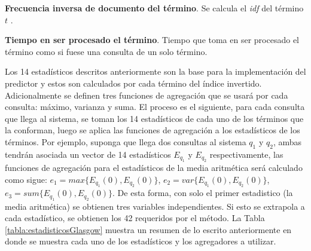 \begin{list}{}{}
	\item \textbf{Frecuencia inversa de documento del término}. Se calcula el \textit{idf} del término $t$ \citep{Baeza-Yates:2011}.
	
	\item \textbf{Tiempo en ser procesado el término}. Tiempo que toma en ser procesado el término como si fuese una consulta de un solo término.

\end{list}

Los 14 estadísticos descritos anteriormente son la base para la implementación del predictor y estos son calculados por cada término del índice invertido. Adicionalmente se definen tres funciones de agregación que se usará por cada consulta: máximo, varianza y suma. El proceso es el siguiente, para cada consulta que llega al sistema, se toman los 14 estadísticos de cada uno de los términos que la conforman, luego se aplica las funciones de agregación a los estadísticos de los términos. Por ejemplo, suponga que llega dos consultas al sistema $q_1$ y $q_2$, ambas tendrán asociada un vector de 14 estadísticos $E_{q_1}$ y $E_{q_2}$ respectivamente, las funciones de agregación para el estadísticos de la media aritmética será calculado como sigue: $e_1 = max\{E_{q_1}(0), E_{q_2}(0)\}$, $e_2 = var\{E_{q_1}(0), E_{q_2}(0)\}$, $e_3 = sum\{E_{q_1}(0), E_{q_2}(0)\}$. De esta forma, con solo el primer estadistico (la media aritmética) se obtienen tres variables independientes. Si esto se extrapola a cada estadístico, se obtienen los 42 requeridos por el método. 
La Tabla \ref{tabla:estadisticosGlasgow} muestra un resumen de lo escrito anteriormente en donde se muestra cada uno de los estadísticos y los agregadores a utilizar. 

